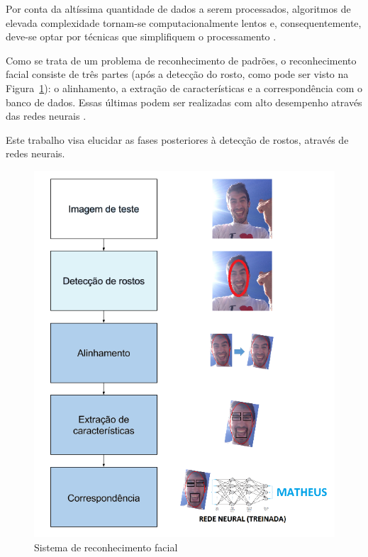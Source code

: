 \documentclass[hidelinks,11pt,twocolumn]{article}
\begin{document}
Por conta da altíssima quantidade de dados a serem processados, algoritmos de elevada complexidade tornam-se computacionalmente lentos e, consequentemente, deve-se optar por técnicas que simplifiquem o processamento \cite{balasuriya}.

Como se trata de um problema de reconhecimento de padrões, o reconhecimento facial consiste de três partes (após a detecção do rosto, como pode ser visto na Figura~\ref{blocos}): o alinhamento, a extração de características e a correspondência com o banco de dados. Essas últimas podem ser realizadas com alto desempenho através das redes neurais \cite{le}.

Este trabalho visa elucidar as fases posteriores à detecção de rostos, através de redes neurais.

\begin{figure}[H]
\centering
\graphicspath{{IMAGENS/}}
\includegraphics[width = 1\linewidth]{sistema.png}
\setlength{\abovecaptionskip}{0pt}
\setlength{\belowcaptionskip}{0pt}
\caption{Sistema de reconhecimento facial}
\label{blocos}
\end{figure}
\end{document}
